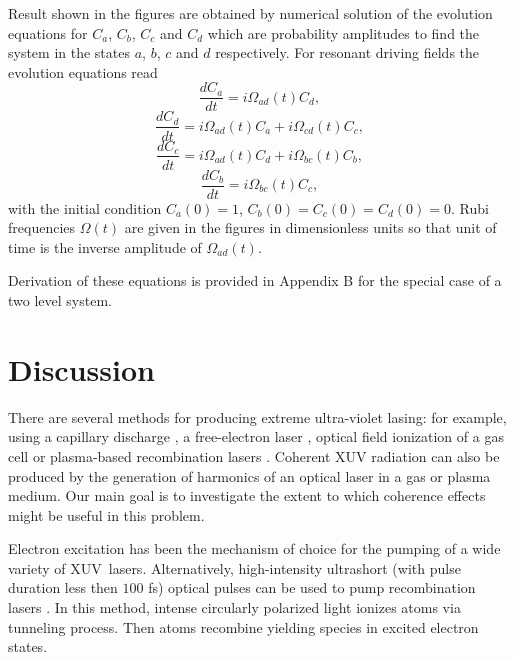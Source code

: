 \documentclass[preprint,preprintnumbers]{revtex4}
\begin{document}
Result shown in the figures are obtained by numerical solution of the
evolution equations for $C_{a}$, $C_{b}$, $C_{c}$ and $C_{d}$ which are
probability amplitudes to find the system in the states $a$, $b$, $c$ and $d$
respectively. For resonant driving fields the evolution equations read%
\begin{equation}
\frac{dC_{a}}{dt}=i\Omega _{ad}(t)C_{d},
\end{equation}%
\begin{equation}
\frac{dC_{d}}{dt}=i\Omega _{ad}(t)C_{a}+i\Omega _{cd}(t)C_{c},
\end{equation}%
\begin{equation}
\frac{dC_{c}}{dt}=i\Omega _{ad}(t)C_{d}+i\Omega _{bc}(t)C_{b},
\end{equation}%
\begin{equation}
\frac{dC_{b}}{dt}=i\Omega _{bc}(t)C_{c},
\end{equation}%
with the initial condition $C_{a}(0)=1$, $C_{b}(0)=C_{c}(0)=C_{d}(0)=0$.
Rubi frequencies $\Omega (t)$ are given in the figures in dimensionless
units so that unit of time is the inverse amplitude of $\Omega _{ad}(t)$.

Derivation of these equations is provided in Appendix B for the special case
of a two level system.

\section{Discussion}

There are several methods for producing extreme ultra-violet lasing: for
example, using a capillary discharge \cite{Rocc94}, a free-electron laser
\cite{Milt01}, optical field ionization of a gas cell \cite{Lemo95} or
plasma-based recombination lasers \cite{Suck85}. Coherent XUV radiation can
also be produced by the generation of harmonics of an optical laser in a gas
or plasma medium. Our main goal is to investigate the extent to which
coherence effects might be useful in this problem.

Electron excitation has been the mechanism of choice for the pumping of a
wide variety of XUV\ lasers. Alternatively, high-intensity ultrashort (with
pulse duration less then $100$ fs) optical pulses can be used to pump
recombination lasers \cite{Burn89}. In this method, intense circularly
polarized light ionizes atoms via tunneling process. Then atoms recombine
yielding species in excited electron states.
\end{document}
